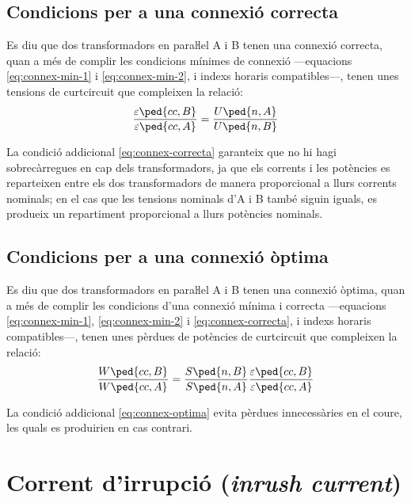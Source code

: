 \subsection{Condicions per a una connexió correcta}\label{sec:connex-correcta}
 Es diu que dos transformadors en paraŀlel  A i B tenen una connexió correcta, quan a més de complir les condicions mínimes de connexió ---equacions \eqref{eq:connex-min-1} i \eqref{eq:connex-min-2}, i indexs horaris compatibles---, tenen unes tensions de curtcircuit que compleixen la relació:
\begin{equation}
    \frac{\varepsilon\ped{cc,B}}{\varepsilon\ped{cc,A}} = \frac{U\ped{n,A}}{U\ped{n,B}}\label{eq:connex-correcta}
\end{equation}

La condició addicional  \eqref{eq:connex-correcta} garanteix que no hi hagi sobrecàrregues en cap dels transformadors, ja que els corrents i les potències es reparteixen entre els dos transformadors de manera proporcional a llurs corrents nominals; en el cas que les tensions nominals d'A i B també siguin  iguals, es produeix un repartiment proporcional a llurs potències nominals.


\subsection{Condicions per a una connexió òptima}\label{sec:connex-optima}

 Es diu que dos transformadors en paraŀlel A i B tenen una connexió òptima, quan a més de complir les condicions d'una connexió mínima i correcta ---equacions \eqref{eq:connex-min-1}, \eqref{eq:connex-min-2} i \eqref{eq:connex-correcta}, i indexs horaris compatibles---, tenen unes pèrdues de potències de curtcircuit que compleixen la relació:
\begin{equation}
    \frac{W\ped{cc,B}}{W\ped{cc,A}} = \frac{S\ped{n,B}}{S\ped{n,A}} \frac{\varepsilon\ped{cc,B}}{\varepsilon\ped{cc,A}} \label{eq:connex-optima}
\end{equation}

La condició addicional \eqref{eq:connex-optima} evita pèrdues innecessàries en el coure, les quals es produirien en cas contrari.


\section{Corrent d'irrupció (\textit{inrush current})}

